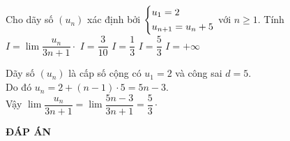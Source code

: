 \begin{ex}%
	Cho dãy số $ \left(u_n \right) $ xác định bởi $ \left\{\begin{aligned}&u_1 = 2 \\ & u_{n+1} = u_n + 5\end{aligned}\right. $	 với $ n \ge 1 $. Tính $ I = \lim \dfrac{u_n}{3n+ 1} \cdot$
	\choice
	{ $ I = \dfrac{3}{10} $}
	{ $ I = \dfrac{1}{3} $}
	{\True $ I = \dfrac{5}{3} $ }
	{ $ I = +\infty $}	
	\loigiai
	{Dãy số $ \left(u_n \right) $ là cấp số cộng có $ u_1 = 2 $ và công sai $ d = 5 $.\\ Do đó $ u_n = 2 + (n-1) \cdot 5 = 5n - 3. $\\
		Vậy $ \lim \dfrac{u_n}{3n + 1} = \lim \dfrac{5n - 3}{3n+ 1} = \dfrac{5}{3} \cdot $
		
	}
\end{ex}	
\newpage
\begin{center}
	\textbf{ĐÁP ÁN}
\end{center}
\begin{multicols}{10}
	 
\end{multicols}
